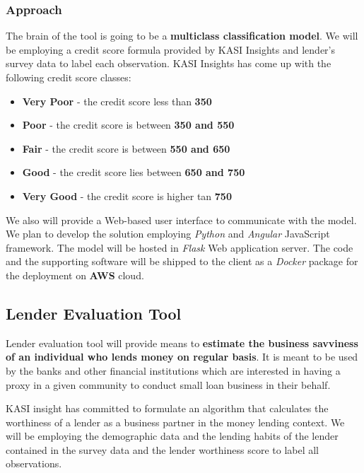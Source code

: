 \hypertarget{approach}{%
\subsubsection{Approach}\label{approach}}

The brain of the tool is going to be a \textbf{multiclass classification
model}. We will be employing a credit score formula provided by KASI
Insights and lender's survey data to label each observation. KASI
Insights has come up with the following credit score classes:

\begin{itemize}
\tightlist
\item
  \textbf{Very Poor} - the credit score less than \textbf{350}
\item
  \textbf{Poor} - the credit score is between \textbf{350 and 550}
\item
  \textbf{Fair} - the credit score is between \textbf{550 and 650}
\item
  \textbf{Good} - the credit score lies between \textbf{650 and 750}
\item
  \textbf{Very Good} - the credit score is higher tan \textbf{750}
\end{itemize}

We also will provide a Web-based user interface to communicate with the
model. We plan to develop the solution employing \emph{Python} and
\emph{Angular} JavaScript framework. The model will be hosted in
\emph{Flask} Web application server. The code and the supporting
software will be shipped to the client as a \emph{Docker} package for
the deployment on \textbf{AWS} cloud.

\hypertarget{lender-evaluation-tool}{%
\subsection{Lender Evaluation Tool}\label{lender-evaluation-tool}}

Lender evaluation tool will provide means to \textbf{estimate the
business savviness of an individual who lends money on regular basis}.
It is meant to be used by the banks and other financial institutions
which are interested in having a proxy in a given community to conduct
small loan business in their behalf.

KASI insight has committed to formulate an algorithm that calculates the
worthiness of a lender as a business partner in the money lending
context. We will be employing the demographic data and the lending
habits of the lender contained in the survey data and the lender
worthiness score to label all observations.


